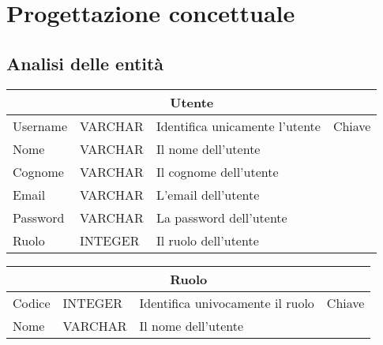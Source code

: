 \chapter{Progettazione concettuale}

\section{Analisi delle entità}

\begin{tabular}{|llll|}
    \hline
    \multicolumn{4}{|c|}{\textbf{Utente}}                                                                                        \\ \hline
    \multicolumn{1}{|l|}{Username} & \multicolumn{1}{l|}{VARCHAR} & \multicolumn{1}{l|}{Identifica unicamente l'utente} & Chiave \\ \hline
    \multicolumn{1}{|l|}{Nome}     & \multicolumn{1}{l|}{VARCHAR} & \multicolumn{2}{l|}{Il nome dell'utente}                     \\ \hline
    \multicolumn{1}{|l|}{Cognome}  & \multicolumn{1}{l|}{VARCHAR} & \multicolumn{2}{l|}{Il cognome dell'utente}                  \\ \hline
    \multicolumn{1}{|l|}{Email}    & \multicolumn{1}{l|}{VARCHAR} & \multicolumn{2}{l|}{L'email dell'utente}                     \\ \hline
    \multicolumn{1}{|l|}{Password} & \multicolumn{1}{l|}{VARCHAR} & \multicolumn{2}{l|}{La password dell'utente}                 \\ \hline
    \multicolumn{1}{|l|}{Ruolo}    & \multicolumn{1}{l|}{INTEGER} & \multicolumn{2}{l|}{Il ruolo dell'utente}                    \\ \hline
    \end{tabular}

\begin{tabular}{|llll|}
    \hline
    \multicolumn{4}{|c|}{\textbf{Ruolo}}                                                                                         \\ \hline
    \multicolumn{1}{|l|}{Codice} & \multicolumn{1}{l|}{INTEGER} & \multicolumn{1}{l|}{Identifica univocamente il ruolo} & Chiave \\ \hline
    \multicolumn{1}{|l|}{Nome}   & \multicolumn{1}{l|}{VARCHAR} & \multicolumn{2}{l|}{Il nome dell'utente}                       \\ \hline
\end{tabular}

